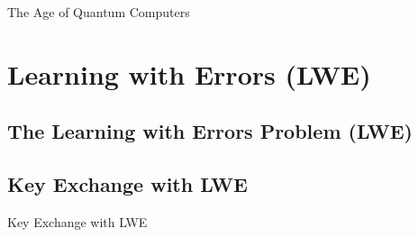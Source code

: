 \documentclass{beamer}
\begin{document}
        \begin{frame}{The Age of Quantum Computers}

        \end{frame}



\section{Learning with Errors (LWE)}

    \subsection{The Learning with Errors Problem (LWE)}




    \subsection{Key Exchange with LWE}


        \begin{frame}{Key Exchange with LWE}


        \end{frame}

\end{document}
